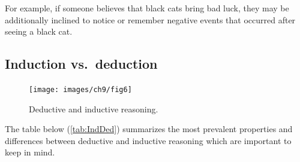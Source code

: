 \documentclass[
]{krantz}
\begin{document}
For example, if someone believes that black cats bring bad luck, they may be additionally inclined to notice or remember negative events that occurred after seeing a black cat.

\subsection*{Induction vs.~deduction}\label{induction-vs.-deduction}


\begin{figure}

{\centering \texttt{[image: images/ch9/fig6]} 

}

\caption{Deductive and inductive reasoning.}\label{fig:reasoning}
\end{figure}

The table below (\ref{tab:IndDed}) summarizes the most prevalent properties and differences between deductive and inductive reasoning which are important to keep in mind.
\end{document}
